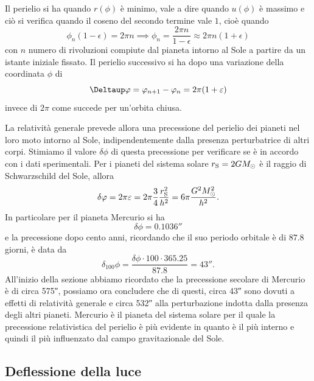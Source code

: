  Il perielio si ha quando $r(\phi)$ è
minimo, vale a dire quando $u(\phi)$ è massimo e ciò si verifica quando il
coseno del secondo termine vale $1$, cioè quando
\begin{equation}
  \phi_{n}(1 - \epsilon) = 2\pi n \implies \phi_{n} = \frac{2\pi n}{1 -
    \epsilon} \approx 2\pi n(1 + \epsilon)
\end{equation}
con $n$ numero di rivoluzioni compiute dal pianeta intorno al Sole a partire da
un istante iniziale fissato.  Il perielio successivo si ha dopo una variazione
della coordinata $\phi$ di
\begin{equation}
  \var\phi = \phi_{n+1} - \phi_{n} = 2\pi(1 + \epsilon)
\end{equation}
invece di $2\pi$ come succede per un'orbita chiusa.

La relatività generale prevede allora una precessione del perielio dei pianeti
nel loro moto intorno al Sole, indipendentemente dalla presenza perturbatrice di
altri corpi.  Stimiamo il valore $\delta\phi$ di questa precessione per
verificare se è in accordo con i dati sperimentali.  Per i pianeti del sistema
solare $r_{\textup{S}} = 2GM_{\odot}$ è il raggio di Schwarzschild del Sole,
allora
\begin{equation}
  \delta\phi = 2\pi\epsilon = 2\pi \frac{3}{4}\frac{r_{\textup{S}}^{2}}{h^{2}} =
  6\pi \frac{G^{2}M_{\odot}^{2}}{h^{2}}.
\end{equation}
In particolare per il pianeta Mercurio si ha
\begin{equation}
  \delta\phi = \ang{;;0.1036}
\end{equation}
e la precessione dopo cento anni, ricordando che il suo periodo orbitale è di
$87.8$ giorni, è data da
\begin{equation}
  \delta_{100}\phi = \frac{\delta\phi \cdot 100 \cdot 365.25}{87.8} =
  \ang{;;43}.
\end{equation}
All'inizio della sezione abbiamo ricordato che la precessione secolare di
Mercurio è di circa \ang{;;575}, possiamo ora concludere che di questi, circa
\ang{;;43} sono dovuti a effetti di relatività generale e circa \ang{;;532} alla
perturbazione indotta dalla presenza degli altri pianeti.  Mercurio è il pianeta
del sistema solare per il quale la precessione relativistica del perielio è più
evidente in quanto è il più interno e quindi il più influenzato dal campo
gravitazionale del Sole.

\subsection{Deflessione della luce}
\label{sec:deflessione-luce}

